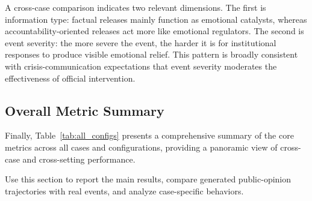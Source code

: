 A cross-case comparison indicates two relevant dimensions. The first is information type: factual releases mainly function as emotional catalysts, whereas accountability-oriented releases act more like emotional regulators. The second is event severity: the more severe the event, the harder it is for institutional responses to produce visible emotional relief. This pattern is broadly consistent with crisis-communication expectations that event severity moderates the effectiveness of official intervention.

\subsection{Overall Metric Summary}

Finally, Table~\ref{tab:all_configs} presents a comprehensive summary of the core metrics across all cases and configurations, providing a panoramic view of cross-case and cross-setting performance.


Use this section to report the main results, compare generated public-opinion trajectories with real events, and analyze case-specific behaviors.
